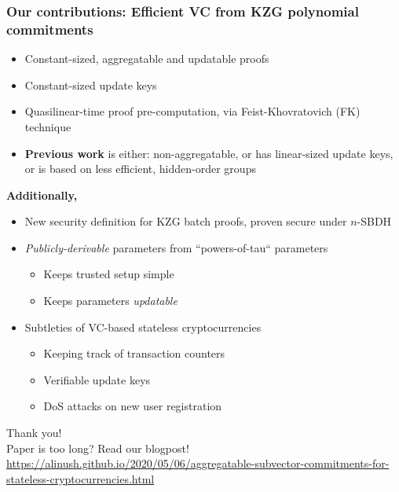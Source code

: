 \begin{frame}
    \frametitle{Our contributions: \alert{Efficient} VC from KZG polynomial commitments~\cite{KZG10a}}

    \small
    \pause
    \begin{itemize}
        \item Constant-sized, aggregatable and updatable proofs\pause
        \item Constant-sized \alert{update keys}\pause
        \item Quasilinear-time proof pre-computation, via Feist-Khovratovich (FK) technique~\cite{FK20}\pause
        \item \textbf{Previous work} is either: non-aggregatable\pause, or has linear-sized update keys\pause, or is based on less efficient, hidden-order groups\pause
    \end{itemize}

    \textbf{Additionally,}\pause
    \begin{itemize}
        \item New security definition for KZG batch proofs, proven secure under $n$-SBDH\pause
        \item \textit{Publicly-derivable} parameters from ``powers-of-tau`` parameters\pause
        \begin{itemize}
            \item Keeps trusted setup simple\pause
            \item Keeps parameters \textit{updatable}\pause
        \end{itemize}
        \item Subtleties of VC-based stateless cryptocurrencies\pause
        \begin{itemize}
            \item Keeping track of transaction counters\pause
            \item Verifiable update keys\pause
            \item DoS attacks on new user registration
        \end{itemize}
    \end{itemize}
\end{frame}

%
%
{
    \begin{frame}[standout]
        Thank you!\\
        \vspace{2em}
        \small
        {\normalfont Paper is too long?}
        Read our blogpost!\\
        \vspace{1em}
        \footnotesize
        \normalfont
        \href{https://alinush.github.io/2020/05/06/aggregatable-subvector-commitments-for-stateless-cryptocurrencies.html}{https://alinush.github.io/2020/05/06/aggregatable-subvector-commitments-for-stateless-cryptocurrencies.html}
    \end{frame}
}